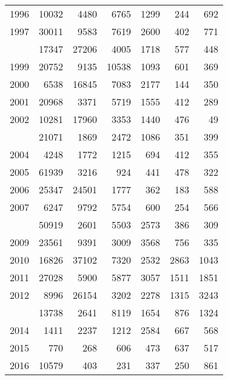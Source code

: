 \documentclass[
]{article}
\begin{document}
\begin{longtable}[t]{lrrrrrr}
1996 & 10032 & 4480 & 6765 & 1299 & 244 & 692\\
1997 & 30011 & 9583 & 7619 & 2600 & 402 & 771\\
\addlinespace
1998 & 17347 & 27206 & 4005 & 1718 & 577 & 448\\
1999 & 20752 & 9135 & 10538 & 1093 & 601 & 369\\
2000 & 6538 & 16845 & 7083 & 2177 & 144 & 350\\
2001 & 20968 & 3371 & 5719 & 1555 & 412 & 289\\
2002 & 10281 & 17960 & 3353 & 1440 & 476 & 49\\
\addlinespace
2003 & 21071 & 1869 & 2472 & 1086 & 351 & 399\\
2004 & 4248 & 1772 & 1215 & 694 & 412 & 355\\
2005 & 61939 & 3216 & 924 & 441 & 478 & 322\\
2006 & 25347 & 24501 & 1777 & 362 & 183 & 588\\
2007 & 6247 & 9792 & 5754 & 600 & 254 & 566\\
\addlinespace
2008 & 50919 & 2601 & 5503 & 2573 & 386 & 309\\
2009 & 23561 & 9391 & 3009 & 3568 & 756 & 335\\
2010 & 16826 & 37102 & 7320 & 2532 & 2863 & 1043\\
2011 & 27028 & 5900 & 5877 & 3057 & 1511 & 1851\\
2012 & 8996 & 26154 & 3202 & 2278 & 1315 & 3243\\
\addlinespace
2013 & 13738 & 2641 & 8119 & 1654 & 876 & 1324\\
2014 & 1411 & 2237 & 1212 & 2584 & 667 & 568\\
2015 & 770 & 268 & 606 & 473 & 637 & 517\\
2016 & 10579 & 403 & 231 & 337 & 250 & 861\\*
\end{longtable}
\end{document}
